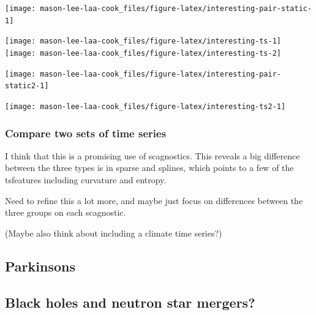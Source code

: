 \begin{Schunk}

\texttt{[image: mason-lee-laa-cook\_files/figure-latex/interesting-pair-static-1]} \end{Schunk}

\begin{Schunk}

\texttt{[image: mason-lee-laa-cook\_files/figure-latex/interesting-ts-1]} 
\texttt{[image: mason-lee-laa-cook\_files/figure-latex/interesting-ts-2]} \end{Schunk}

\begin{Schunk}

\texttt{[image: mason-lee-laa-cook\_files/figure-latex/interesting-pair-static2-1]} \end{Schunk}

\begin{Schunk}

\texttt{[image: mason-lee-laa-cook\_files/figure-latex/interesting-ts2-1]} \end{Schunk}

\hypertarget{compare-two-sets-of-time-series}{%
\subsubsection{Compare two sets of time
series}\label{compare-two-sets-of-time-series}}

I think that this is a promising use of scagnostics. This reveals a big
difference between the three types is in sparse and splines, which
points to a few of the tsfeatures including curvature and entropy.

Need to refine this a lot more, and maybe just focus on differences
between the three groups on each scagnostic.

(Maybe also think about including a climate time series?)

\hypertarget{parkinsons}{%
\subsection{Parkinsons}\label{parkinsons}}

\hypertarget{black-holes-and-neutron-star-mergers}{%
\subsection{Black holes and neutron star
mergers?}\label{black-holes-and-neutron-star-mergers}}

